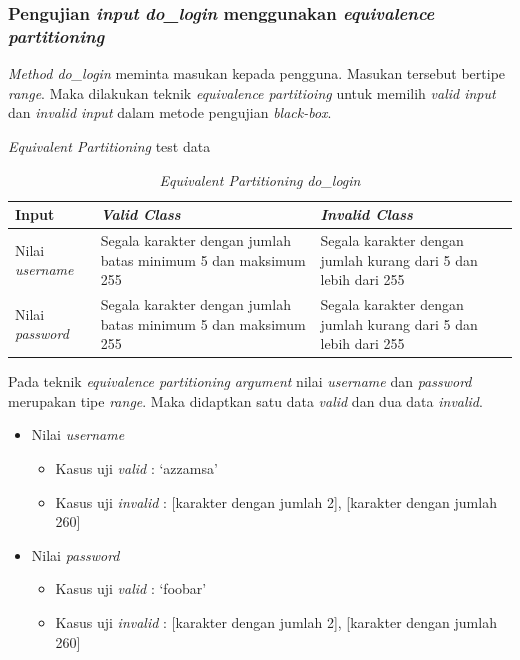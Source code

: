 \subsubsection{Pengujian \emph{input} \emph{do\_login} menggunakan \emph{equivalence partitioning}}

\emph{Method do\_login} meminta masukan kepada pengguna. Masukan
tersebut bertipe \emph{range}. Maka dilakukan teknik \emph{equivalence
partitioing} untuk memilih \emph{valid input} dan \emph{invalid input}
dalam metode pengujian \emph{black-box}.

\noindent
\emph{Equivalent Partitioning} test data

\begin{longtable}[c]{|l|p{4cm}|p{4cm}|}
  \caption{\emph{Equivalent Partitioning} \emph{do\_login}} \label{tc:login-eq} \\
  \hline
  \textbf{Input} & \textbf{\emph{Valid Class}} & \textbf{\emph{Invalid Class}}\\\hline
  Nilai \emph{username}  & Segala karakter dengan jumlah batas minimum
                           5 dan maksimum 255
                                               & Segala karakter dengan jumlah kurang dari 5
                                                 dan lebih dari 255 \\\hline
  Nilai \emph{password}  & Segala karakter dengan jumlah batas minimum
                           5 dan maksimum 255
                                               & Segala karakter dengan jumlah kurang dari 5
                                                 dan lebih dari 255 \\\hline
\end{longtable}

\noindent
Pada teknik \emph{equivalence partitioning} \emph{argument} nilai
\emph{username} dan \emph{password} merupakan tipe \emph{range}. Maka
didaptkan satu data \emph{valid} dan dua data \emph{invalid}.

\begin{itemize}
\item Nilai \emph{username}
  \begin{itemize}
  \item Kasus uji \emph{valid} : `azzamsa'
  \item Kasus uji \emph{invalid}  : [karakter dengan jumlah 2], [karakter dengan jumlah 260]
  \end{itemize}
\item Nilai \emph{password}
  \begin{itemize}
  \item Kasus uji \emph{valid} : `foobar'
  \item Kasus uji \emph{invalid}  : [karakter dengan jumlah 2], [karakter dengan jumlah 260]
  \end{itemize}
\end{itemize}

